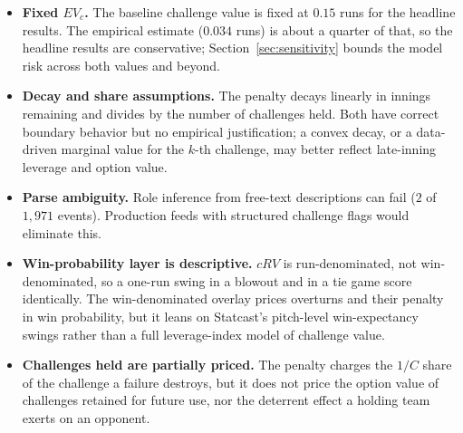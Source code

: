 \begin{itemize}
        artifact of an asymmetric scoring rule.
  \item \textbf{Fixed $EV_c$.} The baseline challenge value is fixed at
        $0.15$ runs for the headline results. The empirical estimate ($0.034$
        runs) is about a quarter of that, so the headline results are
        conservative; Section~\ref{sec:sensitivity} bounds the model risk
        across both values and beyond.
  \item \textbf{Decay and share assumptions.} The penalty decays linearly in
        innings remaining and divides by the number of challenges held. Both
        have correct boundary behavior but no empirical justification; a convex
        decay, or a data-driven marginal value for the $k$-th challenge, may
        better reflect late-inning leverage and option value.
  \item \textbf{Parse ambiguity.} Role inference from free-text descriptions
        can fail ($2$ of $1{,}971$ events). Production feeds with
        structured challenge flags would eliminate this.
  \item \textbf{Win-probability layer is descriptive.} $cRV$ is
        run-denominated, not win-denominated, so a one-run swing in a blowout
        and in a tie game score identically. The win-denominated overlay prices
        overturns and their penalty in win probability, but it leans on
        Statcast's pitch-level win-expectancy swings rather than a full
        leverage-index model of challenge value.
  \item \textbf{Challenges held are partially priced.} The penalty charges the
        $1/C$ share of the challenge a failure destroys, but it does not price
        the option value of challenges retained for future use, nor the
        deterrent effect a holding team exerts on an opponent.
\end{itemize}

